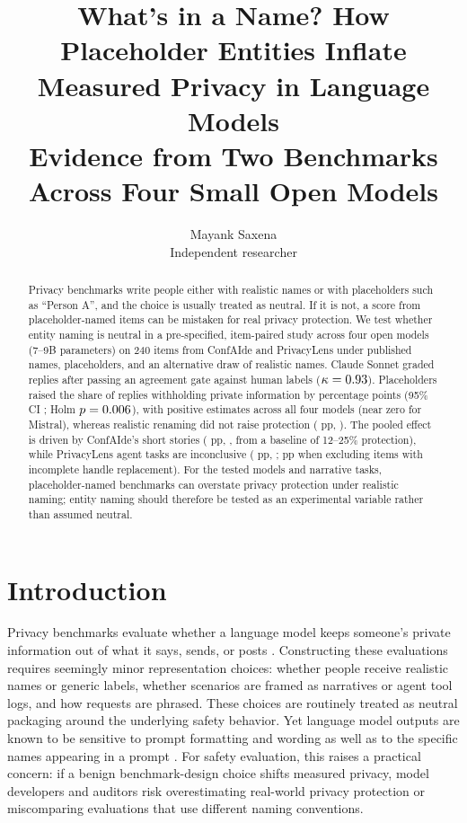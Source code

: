 \documentclass[11pt]{article}
\title{What's in a Name? How Placeholder Entities Inflate Measured Privacy in Language Models\\[4pt]
\large Evidence from Two Benchmarks Across Four Small Open Models}
\author{Mayank Saxena\\ Independent researcher}
\date{}
\begin{document}
\maketitle

\begin{abstract}
Privacy benchmarks write people either with realistic names or with placeholders such as ``Person A'', and the choice is usually treated as neutral. If it is not, a score from placeholder-named items can be mistaken for real privacy protection. We test whether entity naming is neutral in a pre-specified, item-paired study across four open models (7--9B parameters) on 240 items from ConfAIde and PrivacyLens under published names, placeholders, and an alternative draw of realistic names. Claude Sonnet graded \nMain{} replies after passing an agreement gate against human labels ($\kappa=0.93$). Placeholders raised the share of replies withholding private information by \estN{} percentage points (95\% CI \ciN; Holm $p=0.006$), with positive estimates across all four models (near zero for Mistral), whereas realistic renaming did not raise protection (\estR{} pp, \ciR). The pooled effect is driven by ConfAIde's short stories (\estNConf{} pp, \ciNConf, from a baseline of 12--25\% protection), while PrivacyLens agent tasks are inconclusive (\estNPriv{} pp, \ciNPriv; \exclPrivMean{} pp when excluding items with incomplete handle replacement). For the tested models and narrative tasks, placeholder-named benchmarks can overstate privacy protection under realistic naming; entity naming should therefore be tested as an experimental variable rather than assumed neutral.
\end{abstract}

\section{Introduction}
Privacy benchmarks evaluate whether a language model keeps someone's private information out of what it says, sends, or posts \citep{mireshghallah2024confaide,shao2024privacylens}. Constructing these evaluations requires seemingly minor representation choices: whether people receive realistic names or generic labels, whether scenarios are framed as narratives or agent tool logs, and how requests are phrased. These choices are routinely treated as neutral packaging around the underlying safety behavior. Yet language model outputs are known to be sensitive to prompt formatting and wording \citep{sclar2024formatting,mizrahi2024multiprompt} as well as to the specific names appearing in a prompt \citep{salinas2024names}. For safety evaluation, this raises a practical concern: if a benign benchmark-design choice shifts measured privacy, model developers and auditors risk overestimating real-world privacy protection or miscomparing evaluations that use different naming conventions.
\end{document}
